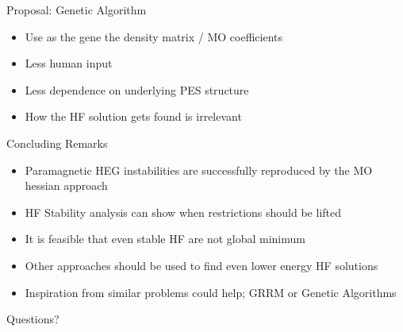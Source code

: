 \documentclass[10pt]{beamer}
\begin{document}
{{{{{{{{{{{{\begin{frame}{Proposal: Genetic Algorithm}
  \begin{itemize}
    \item{ Use as the gene the density matrix / MO coefficients }
    \item{ Less human input }
    \item{ Less dependence on underlying PES structure }
    \item{ How the HF solution gets found is irrelevant } 
  \end{itemize}
\end{frame}

\begin{frame}{Concluding Remarks}
  \begin{itemize}
    \item{ Paramagnetic HEG instabilities are successfully reproduced by the MO hessian approach }
    \item{ HF Stability analysis can show when restrictions should be lifted }
    \item{ It is feasible that even stable HF are not global minimum }
    \item{ Other approaches should be used to find even lower energy HF solutions }
    \item{ Inspiration from similar problems could help; GRRM or Genetic Algorithms } 
  \end{itemize}
\end{frame}


{%
\begin{frame}[standout]
  Questions?
\end{frame}


\appendix



}}}}}}}}}}}}}
\end{document}
